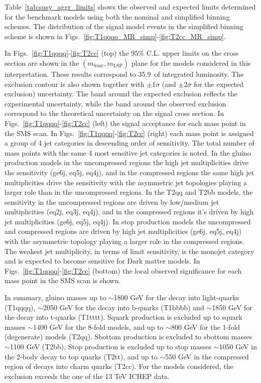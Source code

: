 Table~\ref{tab:susy_aggr_limits} shows the observed and expected limits
determined for the benchmark models using both the nominal and
simplified binning schemes. The distribution of the signal model
events in the simplified binning scheme is shown in
Figs.~\ref{fig:T1qqqq_MR_simp}-\ref{fig:T2cc_MR_simp}.

In Figs.~\ref{fig:T1qqqq}-\ref{fig:T2cc} (top) the 95\% C.L. upper
limits on the cross section are shown in the
$(m_{\mathrm{Susy}},m_{\mathrm{LSP}})$ plane for the models considered
in this interpretation. These results correspond to 35.9~\ifb of
integrated luminosity. The exclusion contour is also shown together
with $\pm1\sigma$ (and $\pm2\sigma$ for the expected exclusion)
uncertainty.  The band around the expected exclusion reflects the
experimental uncertainty, while the band around the observed exclusion
correspond to the theoretical uncertainty on the signal cross
section. In Figs.~\ref{fig:T1qqqq}-\ref{fig:T2cc} (left) the signal
acceptance for each mass point in the SMS scan. In
Figs.~\ref{fig:T1qqqq}-\ref{fig:T2cc} (right) each mass point is
assigned a group of 4 jet categories in descending order of
sensitivity. The total number of mass points with the same 4 most
sensitive jet categories is noted. In the gluino production models in
the uncompressed regions the high jet multiplicities drive the
sensitivity (ge6j, eq5j, eq4j), and in the compressed regions the same
high jet multiplicities drive the sensitivity with the asymmetric jet
topologies playing a larger role than in the uncompressed regions. In
the T2qq and T2bb models, the sensitivity in the uncompressed regions
are driven by low/medium jet multiplicities (eq2j, eq3j, eq4j), and in
the compressed regions it's driven by high jet multiplicities (ge6j,
eq5j, eq4j). In stop production models the uncompressed and compressed
regions are driven by high jet multiplicities (ge6j, eq5j, eq4j) with
the asymmetric topology playing a larger role in the compressed
regions.  The weakest jet multiplicity, in terms of limit sensitivity,
is the monojet category and is expected to become sensitive for Dark
matter models. In Figs.~\ref{fig:T1qqqq}-\ref{fig:T2cc} (bottom) the
local observed significance for each mass point in the SMS scan is
shown.

In summary, gluino masses up to $\sim$1800 GeV for the decay into
light-quarks (T1qqqq), $\sim$2050 GeV for the decay into b-quarks
(T1bbbb) and $\sim$1850 GeV for the decay into t-quarks
(T1tttt). Squark production is excluded up to squark masses $\sim$1400
GeV for the 8-fold models, and up to $\sim$800 GeV for the 1-fold
(degenerate) models (T2qq). Sbottom production is excluded to sbottom
masses $\sim$1100 GeV (T2bb).  Stop production is excluded up to stop
masses $\sim$1050 GeV in the 2-body decay to top quarks (T2tt), and up
to $\sim$550 GeV in the compressed region of decays into charm quarks
(T2cc).  For the models considered, the exclusion exceeds the one of
the 13 TeV ICHEP data.

